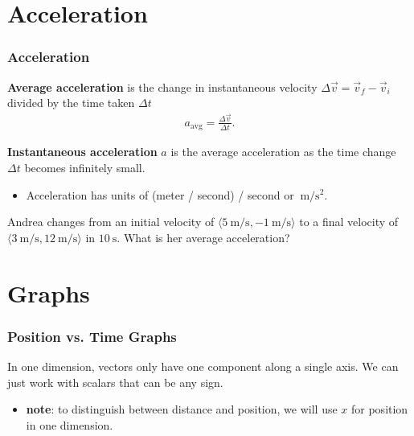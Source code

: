 \documentclass[20pt]{beamer}
\begin{document}
\section{Acceleration}

\begin{frame}
	\frametitle{Acceleration}
	\begin{definition}
		\textbf{Average acceleration} is the change in instantaneous velocity $\Delta \vec{v} = \vec{v}_f - \vec{v}_i$ divided by the time taken $\Delta t$
		\begin{align*}
			a_\mathrm{avg} = \frac{\Delta \vec{v}}{\Delta t}.
		\end{align*}
	\end{definition}

	\begin{definition}
		\textbf{Instantaneous acceleration} $a$ is the average acceleration as the time change $\Delta t$ becomes infinitely small.
	\end{definition}

	\begin{itemize}
		\item Acceleration has units of (meter / second) / second or $\SI{}{\meter / \second^2}$.
	\end{itemize}

	\begin{example}
		Andrea changes from an initial velocity of $\langle \SI{5}{\meter/\second}, \SI{-1}{\meter/\second}\rangle$ to a final velocity of $\langle \SI{3}{\meter/\second}, \SI{12}{\meter/\second} \rangle$ in $\SI{10}{\second}$. What is her average acceleration?
	\end{example}
\end{frame}

\section{Graphs}

\begin{frame}
	\frametitle{Position vs. Time Graphs}
	\begin{figure}[t]
		\centering
		\label{fig:1dvector}
	\end{figure}
	In one dimension, vectors only have one component along a single axis. We can just work with scalars that can be any sign.
	\begin{itemize}
		\item \textbf{note}: to distinguish between distance and position, we will use $x$ for position in one dimension.
	\end{itemize}
	\begin{figure}[b]
		\centering
		\label{fig:labeled-xt}
	\end{figure}
\end{frame}
\end{document}
